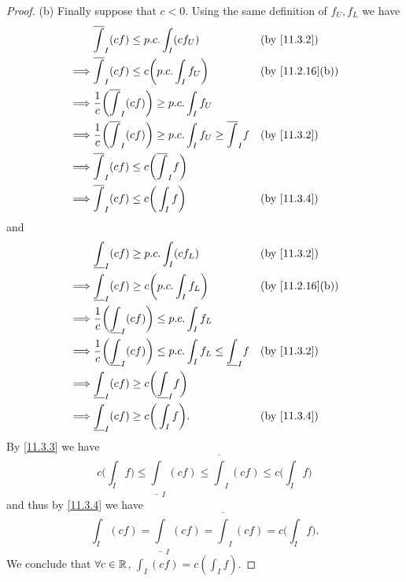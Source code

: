 \begin{proof}{(b)}
  Finally suppose that \(c < 0\).
  Using the same definition of \(f_U, f_L\) we have
  \begin{align*}
             & \overline{\int}_I (cf) \leq p.c. \int_I (c f_U)                                               &  & \by{11.3.2}                   \\
    \implies & \overline{\int}_I (cf) \leq c \bigg(p.c. \int_I f_U\bigg)                                     &  & \text{(by \cref{11.2.16}(b))} \\
    \implies & \dfrac{1}{c} \bigg(\overline{\int}_I (cf)\bigg) \geq p.c. \int_I f_U                                                             \\
    \implies & \dfrac{1}{c} \bigg(\overline{\int}_I (cf)\bigg) \geq p.c. \int_I f_U \geq \overline{\int}_I f &  & \by{11.3.2}                   \\
    \implies & \overline{\int}_I (cf) \leq c\bigg(\overline{\int}_I f\bigg)                                                                     \\
    \implies & \overline{\int}_I (cf) \leq c\bigg(\int_I f\bigg)                                             &  & \by{11.3.4}
  \end{align*}
  and
  \begin{align*}
             & \underline{\int}_I (cf) \geq p.c. \int_I (c f_L)                                                &  & \by{11.3.2}                   \\
    \implies & \underline{\int}_I (cf) \geq c \bigg(p.c. \int_I f_L\bigg)                                      &  & \text{(by \cref{11.2.16}(b))} \\
    \implies & \dfrac{1}{c} \bigg(\underline{\int}_I (cf)\bigg) \leq p.c. \int_I f_L                                                              \\
    \implies & \dfrac{1}{c} \bigg(\underline{\int}_I (cf)\bigg) \leq p.c. \int_I f_L \leq \underline{\int}_I f &  & \by{11.3.2}                   \\
    \implies & \underline{\int}_I (cf) \geq c\bigg(\underline{\int}_I f\bigg)                                                                     \\
    \implies & \underline{\int}_I (cf) \geq c\bigg(\int_I f\bigg).                                             &  & \by{11.3.4}
  \end{align*}
  By \cref{11.3.3} we have
  \[
    c\bigg(\int_I f\bigg) \leq \underline{\int}_I (cf) \leq \overline{\int}_I (cf) \leq c\bigg(\int_I f\bigg)
  \]
  and thus by \cref{11.3.4} we have
  \[
    \int_I (cf) = \underline{\int}_I (cf) = \overline{\int}_I (cf) = c\bigg(\int_I f\bigg).
  \]
  We conclude that \(\forall c \in \mathbb{R}\), \(\int_I (cf) = c (\int_I f)\).
\end{proof}

